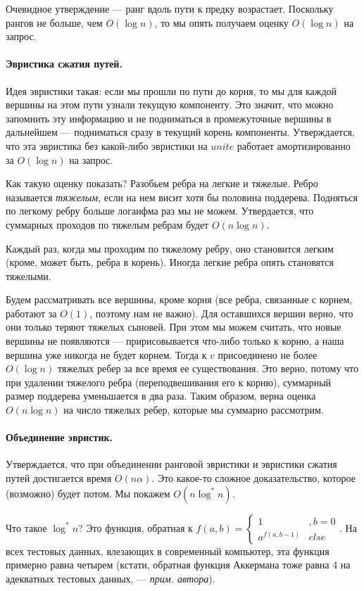 \documentclass[12pt]{article}
\begin{document}
Очевидное утверждение --- ранг вдоль пути к предку возрастает. Поскольку рангов не больше, чем $O(\log n)$, то мы опять получаем оценку $O(\log n)$ на запрос.

\paragraph{Эвристика сжатия путей.} Идея эвристики такая: если мы прошли по пути до корня, то мы для каждой вершины на этом пути узнали текущую компоненту. Это значит, что можно запомнить эту информацию и не подниматься в промежуточные вершины в дальнейшем --- подниматься сразу в текущий корень компоненты. Утверждается, что эта эвристика без какой-либо эвристики на $unite$ работает амортизированно за $O(\log n)$ на запрос.

Как такую оценку показать? Разобьем ребра на легкие и тяжелые. Ребро называется \textit{тяжелым}, если на нем висит хотя бы половина поддерева. Подняться по легкому ребру больше логаифма раз мы не можем.  Утвердается, что суммарных проходов по тяжелым ребрам будет $O(n \log n)$.

Каждый раз, когда мы проходим по тяжелому ребру, оно становится легким (кроме, может быть, ребра в корень). Иногда легкие ребра опять становятся тяжелыми.

Будем рассматривать все вершины, кроме корня (все ребра, связанные с корнем, работают за $O(1)$, поэтому нам не важно). Для оставшихся вершин верно, что они только теряют тяжелых сыновей. При этом мы можем считать, что новые вершины не появляются --- пририсовывается что-либо только к корню, а наша вершина уже никогда не будет корнем. Тогда к $v$ присоединено не более $O(\log n)$ тяжелых ребер за все время ее существования. Это верно, потому что при удалении тяжелого ребра (переподвешивания его к корню), суммарный размер поддерева уменьшается в два раза. Таким образом, верна оценка $O(n \log n)$ на число тяжелых ребер, которые мы суммарно рассмотрим.

\paragraph{Объединение эвристик.} Утверждается, что при объединении ранговой эвристики и эвристики сжатия путей достигается время $O(n \alpha)$. Это какое-то сложное доказательство, которое (возможно) будет потом. Мы покажем $O(n \log^* n)$.

Что такое $\log^* n$? Это функция, обратная к $f(a, b) = \begin{cases} 1 &, b = 0 \\ a^{f(a, b - 1)} & else \end{cases}$. На всех тестовых данных, влезающих в современный компьютер, эта функция примерно равна четырем (кстати, обратная функция Аккермана тоже равна 4 на адекватных тестовых данных, --- \textit{прим. автора}). 
\end{document}
